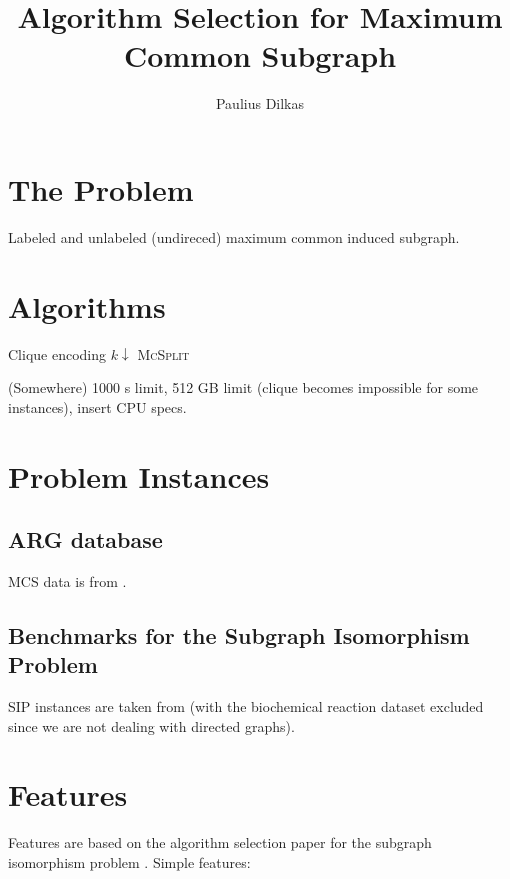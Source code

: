 \documentclass{article}
\author{Paulius Dilkas}
\title{Algorithm Selection for Maximum Common Subgraph}
\begin{document}
\maketitle

\section{The Problem}
Labeled and unlabeled (undireced) maximum common induced subgraph.

\section{Algorithms}
Clique encoding \cite{DBLP:conf/cp/McCreeshNPS16}
$k\downarrow$ \cite{DBLP:conf/aaai/HoffmannMR17}
\textsc{McSplit} \cite{DBLP:conf/ijcai/McCreeshPT17}

(Somewhere) 1000 s limit, 512 GB limit (clique becomes impossible for some
instances), insert CPU specs.

\section{Problem Instances}

\subsection{ARG database}
MCS data is from \cite{DeSanto2003}\cite{foggia2001-2}.

\subsection{Benchmarks for the Subgraph Isomorphism Problem}
SIP instances are taken from \cite{solnon} (with the biochemical reaction
dataset excluded since we are not dealing with directed graphs).

\section{Features}
Features are based on the algorithm selection paper for the subgraph isomorphism
problem \cite{DBLP:conf/lion/KotthoffMS16}. Simple features:
\end{document}
